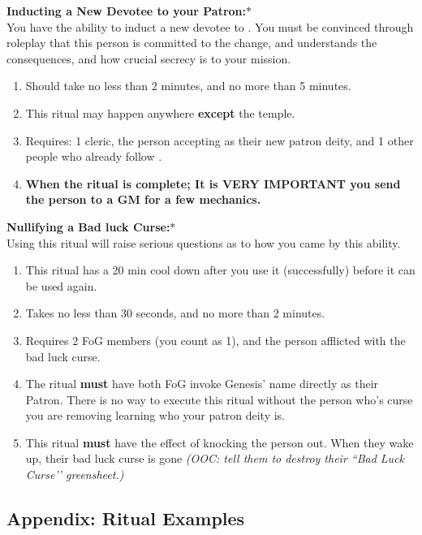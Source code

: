 \documentclass[green]{GL2020}
\begin{document}
\textbf{Inducting a New Devotee to your Patron:}$*$\\
You have the ability to induct a new devotee to \cGenesis{}. You must be convinced through roleplay that this person is committed to the change, and understands the consequences, and how crucial secrecy is to your mission.
  \begin{enumerate}
    \item Should take no less than 2 minutes, and no more than 5 minutes.
    \item This ritual may happen anywhere \textbf{except} the temple.
    \item Requires: 1 cleric, the person accepting \cGenesis{} as their new patron deity, and 1 other people who already follow \cGenesis{}.
		\item \textbf{When the ritual is complete; It is VERY IMPORTANT you send the person to a GM for a few mechanics.}
  \end{enumerate}
   
\textbf{Nullifying a Bad luck Curse:}$*$\\
Using this ritual will raise serious questions as to how you came by this ability.

\begin{enumerate}
    \item This ritual has a 20 min cool down after you use it (successfully) before it can be used again.
    \item Takes no less than 30 seconds, and no more than 2 minutes.
    \item Requires 2 FoG members (you count as 1), and the person afflicted with the bad luck curse.
    \item The ritual \textbf{must} have both FoG invoke Genesis’ name directly as their Patron. There is no way to execute this ritual without the person who’s curse you are removing learning who your patron deity is.
		\item This ritual \textbf{must} have the effect of knocking the person out. When they wake up, their bad luck curse is gone \emph{(OOC: tell them to destroy their ``Bad Luck Curse’’ greensheet.)}
  \end{enumerate}

\subsection*{Appendix: Ritual Examples}
\end{document}
